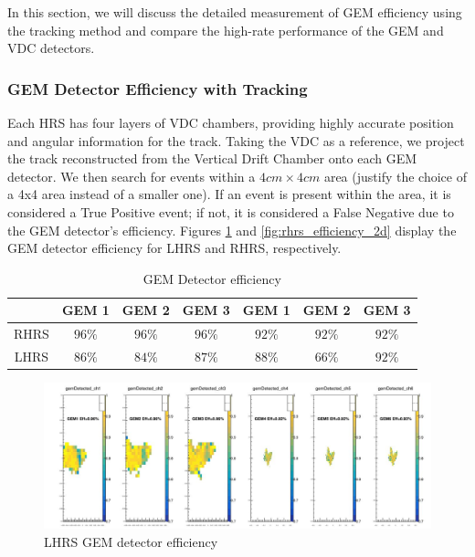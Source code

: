 In this section, we will discuss the detailed measurement of GEM efficiency using the tracking method and compare the high-rate performance of the GEM and VDC detectors.

\subsubsection{GEM Detector Efficiency with Tracking}

Each HRS has four layers of VDC chambers, providing highly accurate position and angular information for the track. Taking the VDC as a reference, we project the track reconstructed from the Vertical Drift Chamber onto each GEM detector. We then search for events within a $4 cm \times 4 cm$ area (justify the choice of a 4x4 area instead of a smaller one). If an event is present within the area, it is considered a True Positive event; if not, it is considered a False Negative due to the GEM detector's efficiency. Figures \ref{fig:lhrs_efficiency_2d} and \ref{fig:rhrs_efficiency_2d} display the GEM detector efficiency for LHRS and RHRS, respectively.

\begin{table}[]
    \centering
    \begin{tabular}{c|c|c|c|c|c|c} \hline
         ~ & GEM 1 & GEM 2 & GEM 3 & GEM 1 & GEM 2 & GEM 3 \\ \hline 
         RHRS & $96\%$ & $96\%$ & $96\%$ & $92\%$& $92\%$& $92\%$  \\ \hline
         LHRS & $86\%$& $84\%$ & $87\%$ & $88\%$ & $66\%$ & $92\%$ \\ \hline
    \end{tabular}
    \caption{GEM Detector efficiency}
    \label{tab:gem_detector_efficiency_table}
\end{table}

\begin{figure}[!htbp]
    \centering
    \includegraphics[width=\textwidth]{images/chap5/lhrs_efficiency_2d.png}
    \caption{LHRS GEM detector efficiency}
    \label{fig:lhrs_efficiency_2d}
\end{figure}

